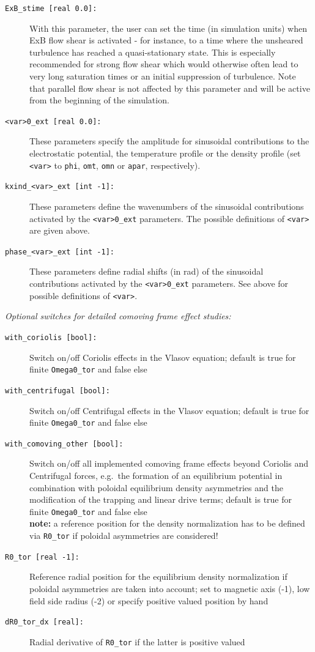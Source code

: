 \documentclass[12pt]{article}
\begin{document}
\begin{description}
\item[\texttt{ExB\_stime [real 0.0]:}] With this parameter, the user can set the time (in simulation units)
  when ExB flow shear is activated - for instance, to a time where the unsheared turbulence has reached a quasi-stationary
  state. This is especially recommended for strong flow shear which would otherwise
  often lead to very long saturation times or an initial suppression of turbulence.
  Note that parallel flow shear is not affected by this parameter and will be active from the beginning of the simulation.
\item[\texttt{<var>0\_ext [real 0.0]:}] These parameters specify the amplitude for sinusoidal contributions to
  the electrostatic potential, the temperature profile or the density profile (set \texttt{<var>} to \texttt{phi},
  \texttt{omt}, \texttt{omn} or \texttt{apar}, respectively).
\item[\texttt{kxind\_<var>\_ext [int -1]:}] These parameters define the wavenumbers of the sinusoidal
  contributions activated by the \texttt{<var>0\_ext} parameters. The possible definitions of \texttt{<var>}
  are given above.
\item[\texttt{phase\_<var>\_ext [int -1]:}] These parameters define radial shifts (in rad) of the sinusoidal
  contributions activated by the \texttt{<var>0\_ext} parameters. See above for possible definitions of \texttt{<var>}.
\end{description}
{\em Optional switches for detailed comoving frame effect studies:}
\begin{description}
\item[\texttt{with\_coriolis [bool]:}] Switch on/off Coriolis effects in the Vlasov equation; default is true for finite {\tt Omega0\_tor} and false else
\item[\texttt{with\_centrifugal [bool]:}] Switch on/off Centrifugal effects in the Vlasov equation; default is true for finite {\tt Omega0\_tor} and false else
\item[\texttt{with\_comoving\_other [bool]:}] Switch on/off all implemented comoving frame effects beyond Coriolis and Centrifugal forces,
e.g.~the formation of an equilibrium potential in combination with poloidal equilibrium density asymmetries and the
modification of the trapping and linear drive terms; default is true for finite {\tt Omega0\_tor} and false else\\
{\bf note:} a reference position for the density normalization has to be defined via {\tt R0\_tor} if poloidal asymmetries are considered!
\item[\texttt{R0\_tor [real -1]:}] Reference radial position for the equilibrium density normalization if poloidal asymmetries are taken into account;
set to magnetic axis (-1), low field side radius (-2) or specify positive valued position by hand
\item[\texttt{dR0\_tor\_dx [real]:}] Radial derivative of {\tt R0\_tor} if the latter is positive valued
\end{description}
\end{document}
